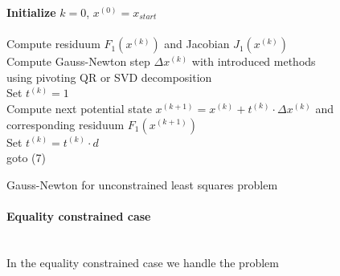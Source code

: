 \documentclass{scrartcl}[12pt, halfparskip]
\numberwithin{equation}{section}
\numberwithin{figure}{section}
\numberwithin{table}{section}
\begin{document}
\begin{algorithm}[H]
	
	
	
	\textbf{Initialize} $k=0$, $x^{(0)} = x_{start}$ \\\mbox{}\\
	
	Compute residuum $F_1(x^{(k)})$ and Jacobian $J_1(x^{(k)})$ \\
	Compute Gauss-Newton step $\Delta x^{(k)}$ with introduced methods \\
	\quad using pivoting QR or SVD decomposition \\
	Set $t^{(k)} = 1$ \\
	Compute next potential state $x^{(k+1)} = x^{(k)} + t^{(k)} \cdot \Delta x^{(k)}$ and \\ \quad corresponding residuum $F_1(x^{(k+1)})$ \\
	
	{Set $t^{(k)} = t^{(k)} \cdot d$ \\
		goto (7)}

	\caption{Gauss-Newton for unconstrained least squares problem}
	\label{alg:Gauss_Newton_unconstrained}
\end{algorithm}

\vspace{0.5cm}
\paragraph{Equality constrained case}\mbox{}\\
In the equality constrained case we handle the problem
\end{document}
